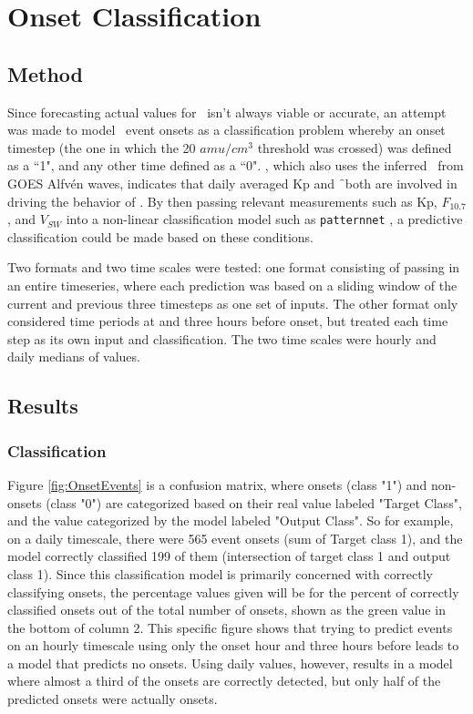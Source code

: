 \chapter[Onset Classification]{Onset Classification}

\section{Method}
Since forecasting actual values for \req\ isn't always viable or accurate, an attempt was made to model \req\ event onsets as a classification problem whereby an onset timestep (the one in which the 20 $amu/cm^3$ threshold was crossed) was defined as a ``1", and any other time defined as a ``0". \cite{Denton2016}, which also uses the inferred \req\ from GOES Alfvén waves, indicates that daily averaged Kp and \f\ both are involved in driving the behavior of \req. By then passing relevant measurements such as Kp, $F_{10.7}$, and $V_{SW}$ into a non-linear classification model such as \texttt{patternnet} \citep{MATLAB:2014}, a predictive classification could be made based on these conditions.

Two formats and two time scales were tested: one format consisting of passing in an entire timeseries, where each prediction was based on a sliding window of the current and previous three timesteps as one set of inputs. The other format only considered time periods at and three hours before onset, but treated each time step as its own input and classification. The two time scales were hourly and daily medians of values. 


\section{Results}

\subsection{Classification}

Figure \ref{fig:OnsetEvents} is a confusion matrix, where onsets (class "1") and non-onsets (class "0") are categorized based on their real value labeled "Target Class", and the value categorized by the model labeled "Output Class". So for example, on a daily timescale, there were 565 event onsets (sum of Target class 1), and the model correctly classified 199 of them (intersection of target class 1 and output class 1). Since this classification model is primarily concerned with correctly classifying onsets, the percentage values given will be for the percent of correctly classified onsets out of the total number of onsets, shown as the green value in the bottom of column 2. This specific figure shows that trying to predict events on an hourly timescale using only the onset hour and three hours before leads to a model that predicts no onsets. Using daily values, however, results in a model where almost a third of the onsets are correctly detected, but only half of the predicted onsets were actually onsets.


